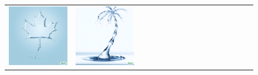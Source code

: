 \begin{figure}[ht!]
\begin{adjustwidth}{-0.8in}{-0.5in}
\begin{tabular}{cccccccccccccccccccc}
\multicolumn{3}{c}{\includegraphics[width=\twobytwocolwidth\textwidth]{figures/cherries/water_maple.jpg}} &
\multicolumn{3}{c}{\includegraphics[width=\twobytwocolwidth\textwidth]{figures/cherries/water_palm.jpg}} &&

\end{tabular}
\end{adjustwidth}
\end{figure}
